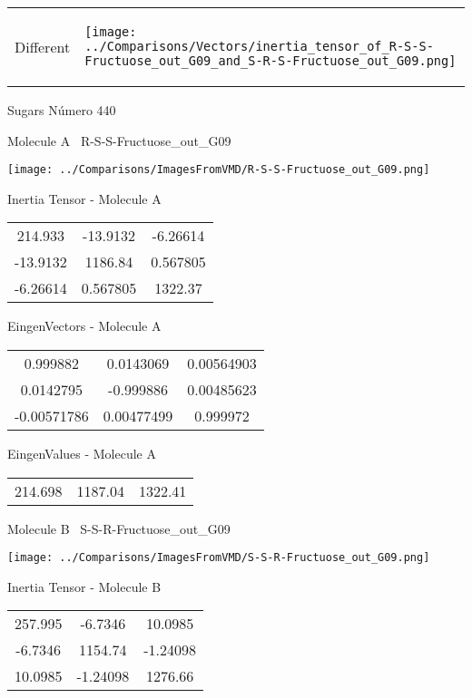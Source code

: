\vtab[-5mm]
\begin{tabular}{*{2}{m{}}}
\begin{center}
\textcolor{NavyBlue}{\Large Different}
\end{center}
&
\begin{center}
\texttt{[image: ../Comparisons/Vectors/inertia\_tensor\_of\_R-S-S-Fructuose\_out\_G09\_and\_S-R-S-Fructuose\_out\_G09.png]}
\end{center}
\end{tabular}

 \newpage

\vtab[-3cm]
\begin{center}
{\large Sugars \tab Número 440}
\end{center}
\begin{multicols}{2}
\begin{center}

Molecule A \
R-S-S-Fructuose\_out\_G09

\texttt{[image: ../Comparisons/ImagesFromVMD/R-S-S-Fructuose\_out\_G09.png]}

Inertia Tensor - Molecule A \\
\begin{tabular}{|c c c|}
214.933	 & 	-13.9132	 & 	-6.26614	 \\
-13.9132	 & 	1186.84	 & 	0.567805	 \\
-6.26614	 & 	0.567805	 & 	1322.37
\end{tabular}

\vtab
 EingenVectors - Molecule A     \\
\begin{tabular}{|c c c|}
0.999882	 & 	0.0143069	 & 	0.00564903	 \\
0.0142795	 & 	-0.999886	 & 	0.00485623	 \\
-0.00571786	 & 	0.00477499	 & 	0.999972
\end{tabular}

\vtab
 EingenValues - Molecule A     \\
\begin{tabular}{|c c c|}
214.698	 & 	1187.04	 & 	1322.41	 \\
\end{tabular}
\columnbreak

Molecule B \
S-S-R-Fructuose\_out\_G09

\texttt{[image: ../Comparisons/ImagesFromVMD/S-S-R-Fructuose\_out\_G09.png]}

Inertia Tensor - Molecule B \\
\begin{tabular}{|c c c|}
257.995	 & 	-6.7346	 & 	10.0985	 \\
-6.7346	 & 	1154.74	 & 	-1.24098	 \\
10.0985	 & 	-1.24098	 & 	1276.66
\end{tabular}


\end{center}
\end{multicols}
